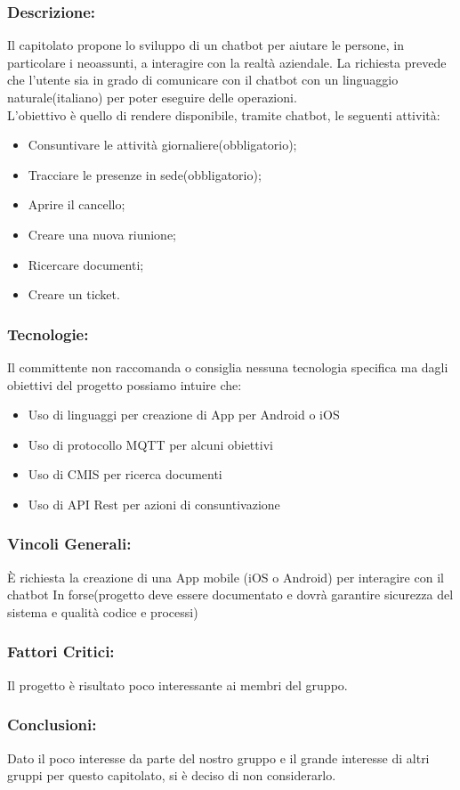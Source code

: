 \subsubsection{Descrizione:}
Il capitolato propone lo sviluppo di un chatbot per aiutare le persone, in particolare i neoassunti, a interagire con la realtà aziendale.
La richiesta prevede che l'utente sia in grado di comunicare con il chatbot con un linguaggio naturale(italiano) per poter eseguire delle operazioni. \\
L'obiettivo è quello di rendere disponibile, tramite chatbot, le seguenti attività:
\begin{itemize}
	\item Consuntivare le attività giornaliere(obbligatorio);
	\item Tracciare le presenze in sede(obbligatorio);
	\item Aprire il cancello;
	\item Creare una nuova riunione;
	\item Ricercare documenti;
	\item Creare un ticket.
	
\end{itemize}

\subsubsection{Tecnologie:}
Il committente non raccomanda o consiglia nessuna tecnologia specifica ma dagli obiettivi del progetto possiamo intuire che:
\begin{itemize}
	\item Uso di linguaggi per creazione di App per Android o iOS
	\item Uso di protocollo MQTT per alcuni obiettivi
	\item Uso di CMIS per ricerca documenti
	\item Uso di API Rest per azioni di consuntivazione  
\end{itemize}

\subsubsection{Vincoli Generali:}
È richiesta la creazione di una App mobile (iOS o Android) per interagire con il chatbot
In forse(progetto deve essere documentato e dovrà garantire sicurezza del sistema e qualità codice e processi)


\subsubsection{Fattori Critici:}
Il progetto è risultato poco interessante ai membri del gruppo.

\subsubsection{Conclusioni:}
Dato il poco interesse da parte del nostro gruppo e il grande interesse di altri gruppi per questo capitolato, si è deciso di non considerarlo.